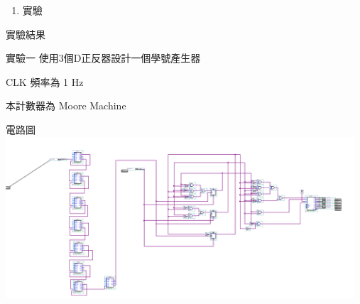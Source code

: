 \documentclass[12pt, a4paper]{article}
\begin{document}
\begin{description}
\begin{enumerate}
          \fontsize{20pt}{22}\selectfont 
          \item 實驗 
        \normalsize
      \end{enumerate}

    \item [二、]實驗結果
      \begin{description}
        \fontsize{20pt}{22pt}\selectfont
        \item 實驗一 \space{1em}使用3個D正反器設計一個學號產生器
            \begin{description}
              \fontsize{18pt}{20pt}
                \item [$\bullet$] CLK 頻率為 1 Hz 
                \item [$\bullet$] 本計數器為 Moore Machine \\
                \item []電路圖 \\[.3cm]
                  \includegraphics[width=13cm]{./image/ex1.png}
            \end{description}
          \normalsize
          

\end{description}
\end{description}
\end{document}
